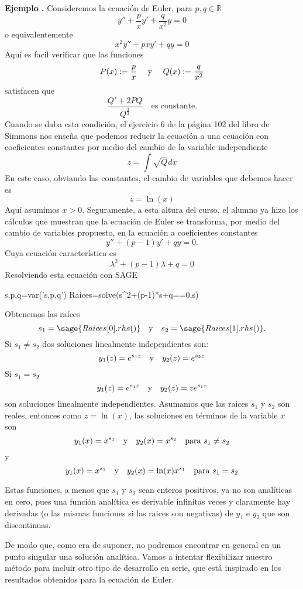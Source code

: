 \documentclass{article}
\newcounter{ejem_cont}
\newenvironment{ejemplo}[1]{\refstepcounter{ejem_cont}\vspace{1ex}\noindent\textbf{Ejemplo \arabic{ejem_cont}.} #1}{}
\newcounter{ejer_cont}
\newcommand{\rr}{\mathbb{R}}
\begin{document}
\begin{ejemplo} Consideremos la ecuación de Euler, para $p,q\in\rr$
\[y''+\frac{p}{x}y'+\frac{q}{x^2}y=0\]
o equivalentemente
\[x^2y''+pxy'+qy=0\]
Aquí es facil verificar que las funciones
\[P(x):=\frac{p}{x}\quad\hbox{ y }\quad Q(x):= \frac{q}{x^2}\]
satisfacen que
\[\frac{Q'+2PQ}{Q^{\frac{3}{2}}}\quad\text{es constante.}\]
 Cuando se daba esta condición, el ejercicio 6 de la página 102 del libro de Simmons nos enseña que podemos reducir la ecuación a una ecuación con coeficientes constantes por medio del cambio de la variable independiente
\[z=\int\sqrt{Q}dx\]
En este caso, obviando las constantes, el cambio de variables que debemos hacer es
\[z=\ln(x)\]
Aquí  asumimos $x>0$. Seguramente, a esta altura del curso,  el alumno ya hizo los cálculos que muestran que la ecuación de Euler se transforma,  por medio del cambio de variables propuesto, en la ecuación a coeficientes constantes
\[y''+(p-1)y'+qy=0.\]
Cuya ecuación característica es
\[\lambda^2+(p-1)\lambda+q=0\]
Resolviendo esta ecuación con SAGE

\begin{sageblock}
s,p,q=var('s,p,q')
Raices=solve(s^2+(p-1)*s+q==0,s)
\end{sageblock}
Obtenemos las raíces 
\[s_1=\sage{Raices[0].rhs()}\quad\text{y}\quad s_2=\sage{Raices[1].rhs()}.\]
 Si $s_1\neq s_2$ dos soluciones linealmente independientes son:
\[y_1(z)=e^{s_1z}\quad\hbox{y}\quad y_2(z)=e^{s_2z}\]
 Si $s_1=s_2$
\[y_1(z)=e^{s_1z} \quad\hbox{y}\quad y_2(z)=ze^{s_1z}\]
son soluciones linealmente independientes. Asumamos que las raices $s_1$ y $s_2$ son reales, entonces como $z=\ln(x)$, las soluciones en términos de la variable $x$ son 
\[y_1(x)=x^{s_1}\quad\hbox{y}\quad y_2(x)=x^{s_2}\quad\text{para }  s_1\neq s_2\]
y
\[y_1(x)=x^{s_1} \quad\hbox{y}\quad y_2(x)=\ln(x)x^{s_1}\quad\text{para }  s_1= s_2\]



Estas funciones, a menos que $s_1$ y $s_2$ sean enteros positivos, ya no son analíticas en cero, pues una función analítica es derivable infinitas veces y claramente hay derivadas (o las mismas funciones si las raices son negativas) de $y_1$ e $y_2$ que son discontinuas. 
\end{ejemplo}


De modo que, como era de suponer, no podremos encontrar en general en un punto singular una solución analítica.  Vamos a intentar flexibilizar nuestro método para incluir otro tipo de desarrollo en serie, que está inspirado en los resultados obtenidos para la ecuación de Euler. 
\end{document}
